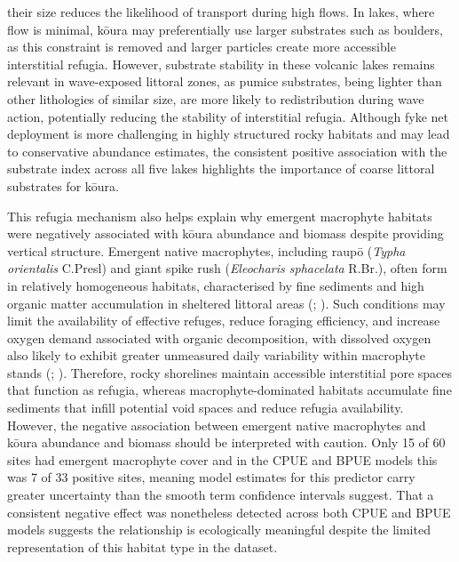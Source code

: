 \documentclass[
  letterpaper,
  DIV=11,
  numbers=noendperiod]{scrartcl}
\newcounter{none} %
\begin{document}
their size reduces the likelihood of transport during high flows. In
lakes, where flow is minimal, kōura may preferentially use larger
substrates such as boulders, as this constraint is removed and larger
particles create more accessible interstitial refugia. However,
substrate stability in these volcanic lakes remains relevant in
wave-exposed littoral zones, as pumice substrates, being lighter than
other lithologies of similar size, are more likely to redistribution
during wave action, potentially reducing the stability of interstitial
refugia. Although fyke net deployment is more challenging in highly
structured rocky habitats and may lead to conservative abundance
estimates, the consistent positive association with the substrate index
across all five lakes highlights the importance of coarse littoral
substrates for kōura.

This refugia mechanism also helps explain why emergent macrophyte
habitats were negatively associated with kōura abundance and biomass
despite providing vertical structure. Emergent native macrophytes,
including raupō (\emph{Typha orientalis} C.Presl) and giant spike rush
(\emph{Eleocharis sphacelata} R.Br.), often form in relatively
homogeneous habitats, characterised by fine sediments and high organic
matter accumulation in sheltered littoral areas
(;
). Such conditions may
limit the availability of effective refuges, reduce foraging efficiency,
and increase oxygen demand associated with organic decomposition, with
dissolved oxygen also likely to exhibit greater unmeasured daily
variability within macrophyte stands (; ).
Therefore, rocky shorelines maintain accessible interstitial pore spaces
that function as refugia, whereas macrophyte-dominated habitats
accumulate fine sediments that infill potential void spaces and reduce
refugia availability. However, the negative association between emergent
native macrophytes and kōura abundance and biomass should be interpreted
with caution. Only 15 of 60 sites had emergent macrophyte cover and in
the CPUE and BPUE models this was 7 of 33 positive sites, meaning model
estimates for this predictor carry greater uncertainty than the smooth
term confidence intervals suggest. That a consistent negative effect was
nonetheless detected across both CPUE and BPUE models suggests the
relationship is ecologically meaningful despite the limited
representation of this habitat type in the dataset.
\end{document}
